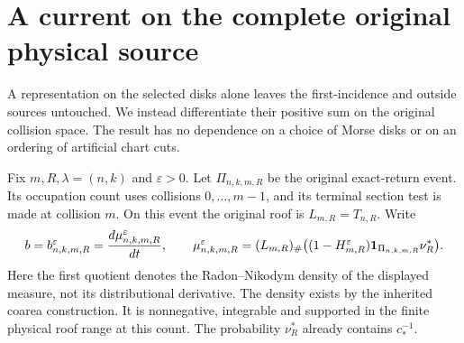 \section{A current on the complete original physical source}
\label{sec:v72-complete-current}
A representation on the selected disks alone leaves the first-incidence
and outside sources untouched. We instead differentiate their positive
sum on the original collision space. The result has no dependence on
a choice of Morse disks or on an ordering of artificial chart cuts.

Fix $m,R,\lambda=(n,k)$ and $\varepsilon>0$. Let
$\Pi_{n,k,m,R}$ be the original exact-return event. Its occupation
count uses collisions $0,\ldots,m-1$, and its terminal section test
is made at collision $m$. On this event the original roof is
$L_{m,R}=T_{n,R}$. Write
\begin{equation}\label{eq:v72-complete-source-density}
 b=b^\varepsilon_{n,k,m,R}
 =\frac{d\mu^\varepsilon_{n,k,m,R}}{dt},\qquad
 \mu^\varepsilon_{n,k,m,R}=(L_{m,R})_\#
  \bigl((1-H_{m,R}^\varepsilon)\one_{\Pi_{n,k,m,R}}\nu_R^*\bigr).
\end{equation}
Here the first quotient denotes the Radon--Nikodym density of the displayed
measure, not its distributional derivative. The density exists by
the inherited coarea construction. It is nonnegative, integrable
and supported in the finite physical roof range at this count.
The probability $\nu_R^*$ already contains $c_*^{-1}$.

